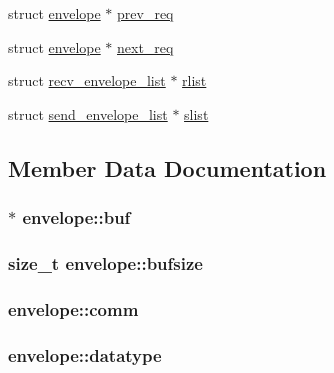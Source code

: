 \begin{DoxyCompactItemize}
struct \hyperlink{structenvelope}{envelope} $\ast$ \hyperlink{structenvelope_ad730f6becbe25a7de3c17601b080c7d2}{prev\-\_\-req}
\item 
struct \hyperlink{structenvelope}{envelope} $\ast$ \hyperlink{structenvelope_afd67aaf8fad8326ec66602c5a75d82b7}{next\-\_\-req}
\item 
struct \hyperlink{structrecv__envelope__list}{recv\-\_\-envelope\-\_\-list} $\ast$ \hyperlink{structenvelope_a62d09c7ab58294fe3f19c6ac2b622b06}{rlist}
\item 
struct \hyperlink{structsend__envelope__list}{send\-\_\-envelope\-\_\-list} $\ast$ \hyperlink{structenvelope_a85e70f590b431d5c918e23c7bc4af7d7}{slist}
\end{DoxyCompactItemize}


\subsection{\-Member \-Data \-Documentation}
\hypertarget{structenvelope_a7f552788a13e834ca55aa72ca1ac5156}{
\subsubsection[{buf}]{$\ast$ {\bf envelope\-::buf}}}\label{structenvelope_a7f552788a13e834ca55aa72ca1ac5156}
\hypertarget{structenvelope_a50c7dfe457385585cb65d15b58cb1dd8}{
\subsubsection[{bufsize}]{\setlength{\rightskip}{0pt plus 5cm}size\-\_\-t {\bf envelope\-::bufsize}}}\label{structenvelope_a50c7dfe457385585cb65d15b58cb1dd8}
\hypertarget{structenvelope_aa27989fe2cdb728765dae8ebc7af00ce}{
\subsubsection[{comm}]{ {\bf envelope\-::comm}}}\label{structenvelope_aa27989fe2cdb728765dae8ebc7af00ce}
\hypertarget{structenvelope_a7fb7546751cd5044702c430ceccbe3e2}{
\subsubsection[{datatype}]{ {\bf envelope\-::datatype}}}\label{structenvelope_a7fb7546751cd5044702c430ceccbe3e2}
